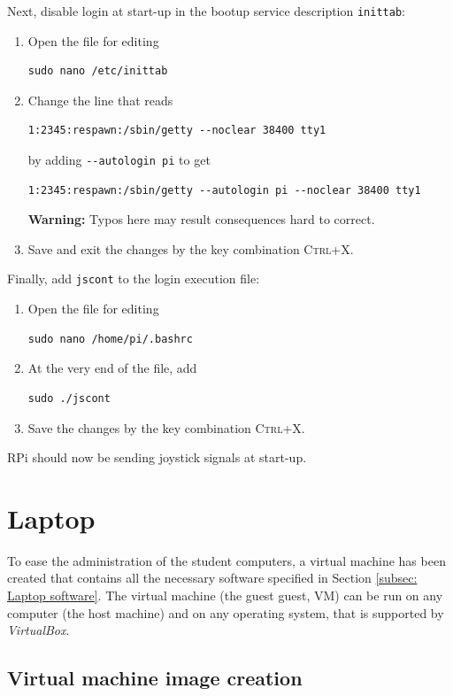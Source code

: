 \documentclass[a4paper,twoside,english]{report}
\newcommand{\noun}[1]{\textsc{#1}}
\begin{document}
Next, disable login at start-up in the bootup service description
\texttt{inittab}:
\begin{enumerate}
\item Open the file for editing \begin{verbatim}sudo nano /etc/inittab\end{verbatim}
\item Change the line that reads \begin{verbatim}1:2345:respawn:/sbin/getty --noclear 38400 tty1\end{verbatim}
by adding \texttt{-{}-autologin pi} to get \begin{verbatim}1:2345:respawn:/sbin/getty --autologin pi --noclear 38400 tty1\end{verbatim}
\textbf{Warning:} Typos here may result consequences hard to correct.
\item Save and exit the changes by the key combination \noun{Ctrl+X}.
\end{enumerate}
Finally, add \texttt{jscont} to the login execution file:
\begin{enumerate}
\item Open the file for editing \begin{verbatim}sudo nano /home/pi/.bashrc\end{verbatim}
\item At the very end of the file, add \begin{verbatim}sudo ./jscont\end{verbatim}
\item Save the changes by the key combination \noun{Ctrl+X}.
\end{enumerate}
RPi should now be sending joystick signals at start-up.

\clearpage{}

\section{Laptop}

To ease the administration of the student computers, a virtual machine
has been created that contains all the necessary software specified
in Section \ref{subsec: Laptop software}. The virtual machine (the
guest guest, VM) can be run on any computer (the host machine) and
on any operating system, that is supported by \emph{VirtualBox}. 

\subsection{\label{subsec: Laptop software}Virtual machine image creation}
\end{document}
